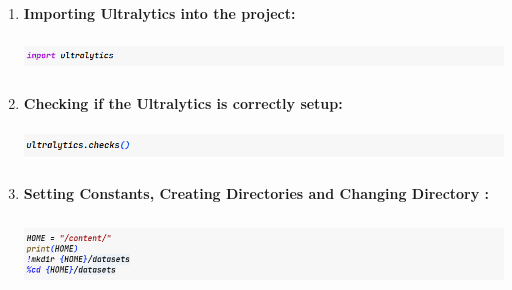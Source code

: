 \documentclass[12 pt]{report}
\begin{document}
{\begin{enumerate}
  \item \textbf{Importing Ultralytics into the project:}
  \begin{center}
      \includegraphics[width=17cm, height=1cm]{import ultralatics.png}
  \end{center}

  \item \textbf{Checking if the Ultralytics is correctly setup:}
  \begin{center}
      \includegraphics[width=17cm, height=1cm]{check ultralatics.png}
  \end{center}

  \item \textbf{Setting Constants, Creating Directories and Changing Directory :}
  \begin{center}
      \includegraphics[width=17cm, height=2cm]{creating home and dataset folder.png}
  \end{center}
\end{enumerate}
}
\end{document}
